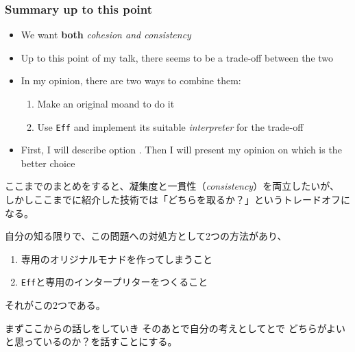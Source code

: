 \begin{frame}
  \frametitle{Summary up to this point}

  \pause
  \begin{itemize}
    \item<+-> We want \textbf{both} \emph{cohesion and consistency}

    \item<+-> Up to this point of my talk,
    there seems to be a trade-off between the two

    \item<+-> In my opinion, there are two ways to combine them:
    \begin{enumerate}
      \item \label{enum:make_original_monad}
      Make an original moand to do it

      \item \label{enum:use_eff}
      Use \lstinline|Eff| and implement its
      suitable \emph{interpreter} for the trade-off
    \end{enumerate}

    \item<+-> First, I will describe option .
    Then I will present my opinion on which is the better choice
  \end{itemize}

  \begin{notes}
    \item ここまでのまとめをすると、凝集度と一貫性（\emph{consistency}）を両立したいが、
    しかしここまでに紹介した技術では「どちらを取るか？」というトレードオフになる。

    \item 自分の知る限りで、この問題への対処方として2つの方法があり、
    \begin{enumerate}
      \item 専用のオリジナルモナドを作ってしまうこと

      \item \lstinline|Eff|と専用のインタープリターをつくること
    \end{enumerate}
    それがこの2つである。

    \item まずここからの話しをしていき
    そのあとで自分の考えとしてとで
    どちらがよいと思っているのか？を話すことにする。
  \end{notes}
\end{frame}

